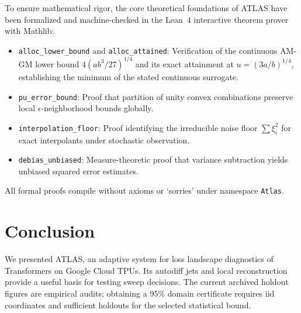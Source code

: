 \documentclass[11pt,a4paper]{article}
\theoremstyle{definition}
\theoremstyle{remark}
\begin{document}
To ensure mathematical rigor, the core theoretical foundations of ATLAS have been formalized and machine-checked in the Lean~4 interactive theorem prover with Mathlib:
\begin{itemize}
    \item \texttt{alloc\_lower\_bound} and \texttt{alloc\_attained}: Verification of the continuous AM-GM lower bound $4(a b^3 / 27)^{1/4}$ and its exact attainment at $u = (3a/b)^{1/4}$, establishing the minimum of the stated continuous surrogate.
    \item \texttt{pu\_error\_bound}: Proof that partition of unity convex combinations preserve local $\epsilon$-neighborhood bounds globally.
    \item \texttt{interpolation\_floor}: Proof identifying the irreducible noise floor $\sum \xi_i^2$ for exact interpolants under stochastic observation.
    \item \texttt{debias\_unbiased}: Measure-theoretic proof that variance subtraction yields unbiased squared error estimates.
\end{itemize}
All formal proofs compile without axioms or `sorries' under namespace \texttt{Atlas}.

\section{Conclusion}

We presented ATLAS, an adaptive system for loss landscape diagnostics of Transformers on Google Cloud TPUs. Its autodiff jets and local reconstruction provide a useful basis for testing sweep decisions. The current archived holdout figures are empirical audits; obtaining a 95\% domain certificate requires iid coordinates and sufficient holdouts for the selected statistical bound.



\end{document}
